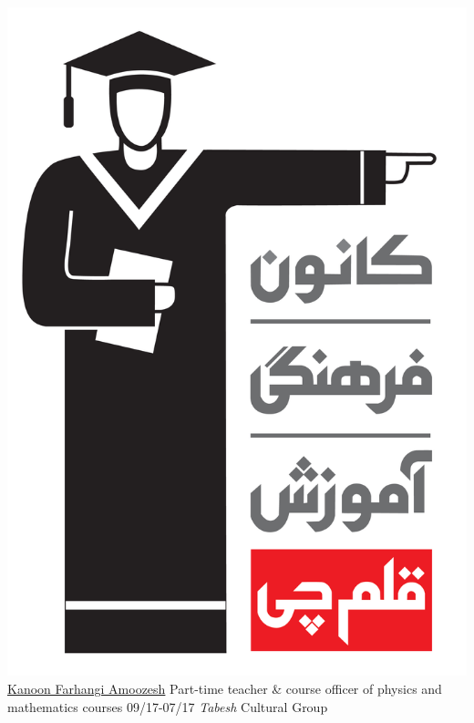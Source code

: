 \documentclass[a4paper]{friggeri-cv}
\begin{document}
\begin{entrylist}
        {\href{http://www.kanoon.ir/}{\includegraphics[scale=0.005]{../assets/images/Kanoon_logo.png} Kanoon Farhangi Amoozesh}}
        {Part-time teacher \& course officer of physics and mathematics courses}
        \entry
        {09/17-07/17}
        {   \emph{Tabesh} Cultural Group}

\end{entrylist}
\end{document}
